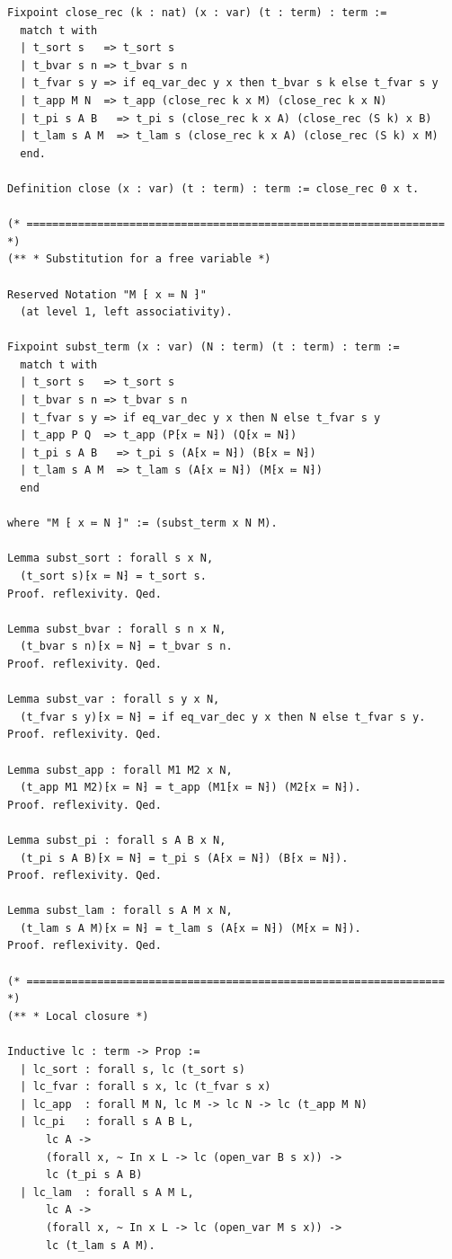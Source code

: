 \begin{latin}
\begin{verbatim}
Fixpoint close_rec (k : nat) (x : var) (t : term) : term :=
  match t with
  | t_sort s   => t_sort s
  | t_bvar s n => t_bvar s n
  | t_fvar s y => if eq_var_dec y x then t_bvar s k else t_fvar s y
  | t_app M N  => t_app (close_rec k x M) (close_rec k x N)
  | t_pi s A B   => t_pi s (close_rec k x A) (close_rec (S k) x B)
  | t_lam s A M  => t_lam s (close_rec k x A) (close_rec (S k) x M)
  end.

Definition close (x : var) (t : term) : term := close_rec 0 x t.

(* ================================================================= *)
(** * Substitution for a free variable *)

Reserved Notation "M ⁅ x ≔ N ⁆"
  (at level 1, left associativity).

Fixpoint subst_term (x : var) (N : term) (t : term) : term :=
  match t with
  | t_sort s   => t_sort s
  | t_bvar s n => t_bvar s n
  | t_fvar s y => if eq_var_dec y x then N else t_fvar s y
  | t_app P Q  => t_app (P⁅x ≔ N⁆) (Q⁅x ≔ N⁆)
  | t_pi s A B   => t_pi s (A⁅x ≔ N⁆) (B⁅x ≔ N⁆)
  | t_lam s A M  => t_lam s (A⁅x ≔ N⁆) (M⁅x ≔ N⁆)
  end

where "M ⁅ x ≔ N ⁆" := (subst_term x N M).

Lemma subst_sort : forall s x N,
  (t_sort s)⁅x ≔ N⁆ = t_sort s.
Proof. reflexivity. Qed.

Lemma subst_bvar : forall s n x N,
  (t_bvar s n)⁅x ≔ N⁆ = t_bvar s n.
Proof. reflexivity. Qed.

Lemma subst_var : forall s y x N,
  (t_fvar s y)⁅x ≔ N⁆ = if eq_var_dec y x then N else t_fvar s y.
Proof. reflexivity. Qed.

Lemma subst_app : forall M1 M2 x N,
  (t_app M1 M2)⁅x ≔ N⁆ = t_app (M1⁅x ≔ N⁆) (M2⁅x ≔ N⁆).
Proof. reflexivity. Qed.

Lemma subst_pi : forall s A B x N,
  (t_pi s A B)⁅x ≔ N⁆ = t_pi s (A⁅x ≔ N⁆) (B⁅x ≔ N⁆).
Proof. reflexivity. Qed.

Lemma subst_lam : forall s A M x N,
  (t_lam s A M)⁅x ≔ N⁆ = t_lam s (A⁅x ≔ N⁆) (M⁅x ≔ N⁆).
Proof. reflexivity. Qed.

(* ================================================================= *)
(** * Local closure *)

Inductive lc : term -> Prop :=
  | lc_sort : forall s, lc (t_sort s)
  | lc_fvar : forall s x, lc (t_fvar s x)
  | lc_app  : forall M N, lc M -> lc N -> lc (t_app M N)
  | lc_pi   : forall s A B L,
      lc A ->
      (forall x, ~ In x L -> lc (open_var B s x)) ->
      lc (t_pi s A B)
  | lc_lam  : forall s A M L,
      lc A ->
      (forall x, ~ In x L -> lc (open_var M s x)) ->
      lc (t_lam s A M).


\end{verbatim}
\end{latin}
